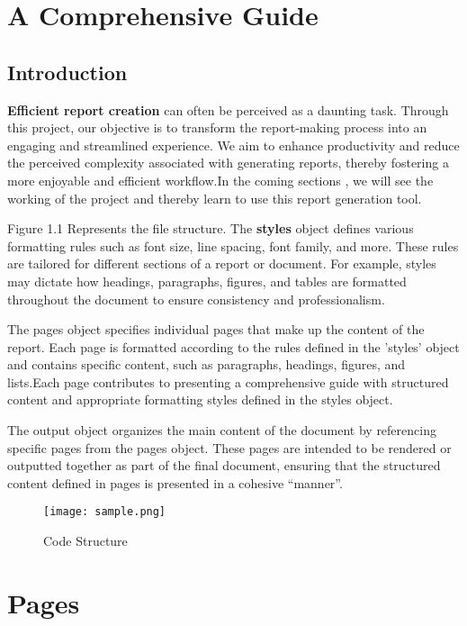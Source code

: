\documentclass[oneside]{book}
\begin{document}
\setcounter{page}{0}
\tableofcontents
\newpage\listoffigures
\clearpage
{}
\setcounter{page}{1}
\newpage
\chapter{A Comprehensive Guide}
\section{Introduction}
\textbf{Efficient report creation} can often be perceived as a daunting task. Through this project, our objective is to transform the report-making process
             into an engaging and streamlined experience. We aim to enhance productivity and reduce the perceived complexity associated with generating reports,
             thereby fostering a more enjoyable and efficient workflow.In the coming sections , we will see the working of the project and thereby learn to use this
              report generation tool.\par
Figure 1.1 Represents the file structure.
            The \textbf{styles} object defines various formatting rules such as font size, line spacing, font family, and more. These rules are tailored for different 
            sections of a report or document. For example, styles may dictate how headings, paragraphs, figures, and tables are formatted throughout the document 
            to ensure consistency and professionalism.\par
The pages object specifies individual pages that make up the content of the report. Each page is formatted according to the 
            rules defined in the 'styles' object and contains specific content, such as paragraphs, headings, figures, and lists.Each page contributes to presenting a 
            comprehensive guide with structured content and appropriate formatting styles defined in the styles object.\par
The output object organizes the main content of the document by referencing specific pages from the pages object.
            These pages are intended to be rendered or outputted together as part of the final document, ensuring that the structured content defined in pages is 
            presented in a cohesive ``manner''.\par
\begin{figure}[h]
\centering
\texttt{[image: sample.png]}
\caption{Code Structure}
\end{figure}
\newpage
\chapter{Pages}
\end{document}
